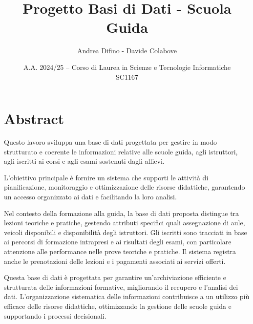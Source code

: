 \documentclass[10pt,twoside]{article}
\author{Andrea Difino - Davide Colabove}
\date{A.A. 2024/25 -- Corso di Laurea in Scienze e Tecnologie Informatiche\\SC1167}
\begin{document}
\pagestyle{fancy}
\fancyhead{}
\title{Progetto Basi di Dati - Scuola Guida}
\maketitle

\section{Abstract}{
    Questo lavoro sviluppa una base di dati progettata per gestire in modo strutturato e coerente le informazioni relative alle scuole guida, agli istruttori, agli iscritti ai corsi e agli esami sostenuti dagli allievi. 
    
    L’obiettivo principale è fornire un sistema che supporti le attività di pianificazione, monitoraggio e ottimizzazione delle risorse didattiche, garantendo un accesso organizzato ai dati e facilitando la loro analisi.

    Nel contesto della formazione alla guida, la base di dati proposta distingue tra lezioni teoriche e pratiche, gestendo attributi specifici quali assegnazione di aule, veicoli disponibili e disponibilità degli istruttori. Gli iscritti sono tracciati in base ai percorsi di formazione intrapresi e ai risultati degli esami, con particolare attenzione alle performance nelle prove teoriche e pratiche. Il sistema registra anche le prenotazioni delle lezioni e i pagamenti associati ai servizi offerti.

    Questa base di dati è progettata per garantire un’archiviazione efficiente e strutturata delle informazioni formative, migliorando il recupero e l’analisi dei dati. L’organizzazione sistematica delle informazioni contribuisce a un utilizzo più efficace delle risorse didattiche, ottimizzando la gestione delle scuole guida e supportando i processi decisionali.

}
\end{document}

